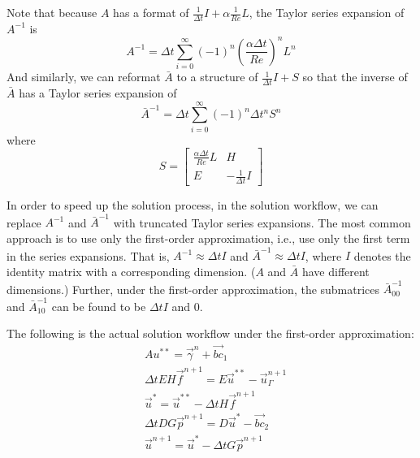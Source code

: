 Note that because $A$ has a format of $\frac{1}{\Delta t}I + \alpha \frac{1}{Re}L$, the Taylor series expansion of $A^{-1}$ is
\begin{equation}\label{eq:approx-A-inv}
    A^{-1} = \Delta t \sum\limits_{i=0}^{\infty} \left(-1\right)^{n}\left(\frac{\alpha\Delta t}{Re}\right)^n L^n
\end{equation}
And similarly, we can reformat $\bar{A}$ to a structure of $\frac{1}{\Delta t}I + S$ so that the inverse of $\bar{A}$ has a Taylor series expansion of
\begin{equation}\label{eq:approx-A-bar-inv}
    \bar{A}^{-1} = \Delta t \sum\limits_{i=0}^{\infty}\left(-1\right)^{n}\Delta t^n S^n
\end{equation}
where
\begin{equation}
    S = \begin{bmatrix}
        \frac{\alpha \Delta t}{Re}L & H \\
        E & -\frac{1}{\Delta t}I
    \end{bmatrix}
\end{equation}

In order to speed up the solution process, in the solution workflow, we can replace $A^{-1}$ and $\bar{A}^{-1}$ with truncated Taylor series expansions.
The most common approach is to use only the first-order approximation, i.e., use only the first term in the series expansions.
That is, $A^{-1} \approx \Delta t I$ and $\bar{A}^{-1} \approx \Delta t I$, where $I$ denotes the identity matrix with a corresponding dimension. ($A$ and $\bar{A}$ have different dimensions.)
Further, under the first-order approximation, the submatrices $\bar{A}_{00}^{-1}$ and $\bar{A}_{10}^{-1}$ can be found to be $\Delta t I$ and $0$.

The following is the actual solution workflow under the first-order approximation:
\begin{subequations}\label{eq:dibpm-first-order}
    \begin{align}
        & A u^{* *} = \vec{\gamma}^n + \vec{bc}_1\label{eq:dibpm-order2-1} \\
        & \Delta t EH \vec{f}^{n+1} = E \vec{u}^{* *} - \vec{u}_\Gamma^{n+1}\label{eq:dibpm-order2-2} \\
        & \vec{u}^* = \vec{u}^{* *} - \Delta t H \vec{f}^{n+1}\label{eq:dibpm-order2-3}\\
        & \Delta t DG \vec{p}^{n+1} = D \vec{u}^* - \vec{bc}_2\label{eq:dibpm-order2-4} \\
        & \vec{u}^{n+1} = \vec{u}^* - \Delta t G \vec{p}^{n+1}\label{eq:dibpm-order2-5}
    \end{align}
\end{subequations}

